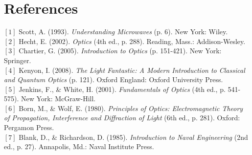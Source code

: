 \documentclass[a4paper,12pt]{report}
\begin{document}
\chapter{References}
$[1]$ Scott, A. (1993). \textit{Understanding Microwaves} (p. 6). New York: Wiley.\\
$[2]$ Hecht, E. (2002). \textit{Optics} (4th ed., p. 288). Reading, Mass.: Addison-Wesley.\\
$[3]$  Chartier, G. (2005). \textit{Introduction to Optics} (p. 151-421). New York: Springer.\\
$[4]$ Kenyon, I. (2008). \textit{The Light Fantastic: A Modern Introduction to Classical and Quantum Optics} (p. 121). Oxford England: Oxford University Press.\\
$[5]$ Jenkins, F., \& White, H. (2001). \textit{Fundamentals of Optics} (4th ed., p. 541-575). New York: McGraw-Hill.\\
$[6]$ Born, M., \& Wolf, E. (1980). \textit{Principles of Optics: Electromagnetic Theory of Propagation, Interference and Diffraction of Light} (6th ed., p. 281). Oxford: Pergamon Press.\\
$[7]$ Blank, D., \& Richardson, D. (1985). \textit{Introduction to Naval Engineering} (2nd ed., p. 27). Annapolis, Md.: Naval Institute Press.
\end{document}
